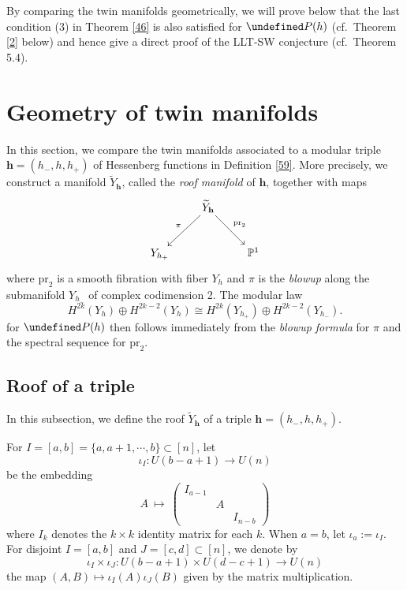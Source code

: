 \documentclass[11pt]{article}
\theoremstyle{definition}
\numberwithin{equation}{section}
\let\cal\undefined
\numberwithin{equation}{section}
\newcommand{\PP}{\mathbb{P}}
\newcommand{\cal}{\mathcal}
\newcommand\cP{{\cal P}}
\newcommand\tY{{\widetilde{Y}}}
\newcommand\lra{\longrightarrow }
\newcommand\beq{\begin{equation}}
\newcommand\eeq{\end{equation}}
\newcommand\pr{\mathrm{pr}}
\newcommand\bh{\mathbf{h}}
\begin{document}
By comparing the twin manifolds geometrically, 
we will prove below that the last condition (3) in Theorem \ref{46} is also satisfied for $\cP(h)$ (cf.~Theorem \ref{2} below) and hence give a direct proof of the LLT-SW conjecture (cf.~Theorem 5.4). 

\section{Geometry of  twin manifolds}\label{3}
In this section, we compare the twin manifolds associated to a modular triple $\bh=(h_-,h,h_+)$ of Hessenberg functions in Definition \ref{59}. 
More precisely, we construct a manifold $\tY_\bh$, called the \emph{roof manifold} of $\bh$, together with maps
$$\xymatrix{&\tY_\bh \ar[ld]_-{\pi}\ar[rd]^-{\pr_2}& \\ Y_{h_+}&&\PP^1}$$
where $\pr_2$ is a smooth fibration with fiber $Y_h$ and $\pi$ is the \emph{blowup} along the submanifold $Y_{h_-}$ of complex codimension 2. 
The modular law  
\beq\label{n30}
H^{2k}(Y_h)\oplus H^{2k-2}(Y_h)\cong H^{2k}(Y_{h_+})\oplus H^{2k-2}(Y_{h_-}).\eeq
for $\cP(h)$ then follows immediately from the \emph{blowup formula} for $\pi$  and the spectral sequence for $\pr_2$.  

\subsection{Roof of a triple} 

In this subsection, we define the roof $\tY_\bh$ of a triple $\bh=(h_-,h,h_+)$. 

For $I=[a,b]=\{a,a+1,\cdots,b\} \subset [n]$, let
\[\iota_I:U(b-a+1)\lra U(n)\]
be the embedding
\[A~\mapsto ~\begin{pmatrix}
	I_{a-1} &&\\&A&\\&&I_{n-b}
\end{pmatrix}\]
where $I_k$ denotes the $k\times k$ identity matrix for each $k$. When $a=b$, let $\iota_a:=\iota_I$. For disjoint $I=[a,b]$ and $J=[c,d]\subset [n]$, we denote by
\[\iota_I\times \iota_J:U(b-a+1)\times U(d-c+1)\lra U(n)\]
the map $(A,B)\mapsto \iota_I(A) \iota_J(B)$ given by the matrix multiplication.
\end{document}

